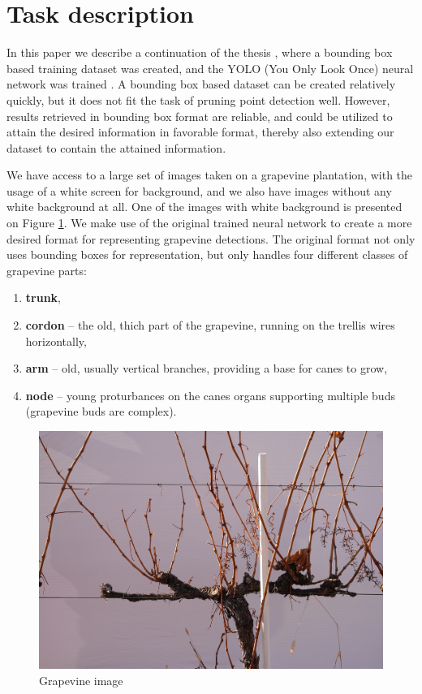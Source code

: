 \documentclass{PSAIE}%
\begin{document}
\section{Task description} \label{sec_task_description}
In this paper we describe a continuation of the thesis \cite{bolyki_2021}, where a bounding box based training
dataset was created, and the YOLO (You Only Look Once) neural network was trained
\cite{glenn_jocher_2021_5563715}.
A bounding box based dataset can be created relatively quickly, but it does not fit the task of pruning
point detection well. However, results retrieved in bounding box format are reliable, and could be utilized
to attain the desired information in favorable format, thereby also extending our dataset to contain the
attained information.

We have access to a large set of images taken on a grapevine plantation, with the usage of a white screen
for background, and we also have images without any white background at all. One of the images with
white background is presented on Figure \ref{fig_grapevine_image}.
We make use of the original \cite{bolyki_2021} trained neural network to create a more desired
format for representing grapevine detections. The original format not only uses bounding boxes for
representation, but only handles four different classes of grapevine parts:
\begin{enumerate}
      \item \textbf{trunk},
      \item \textbf{cordon} -- the old, thich part of the grapevine, running on the trellis wires horizontally,
      \item \textbf{arm} -- old, usually vertical branches, providing a base for canes to grow,
      \item \textbf{node} -- young proturbances on the canes organs supporting multiple buds
            (grapevine buds are complex).
\end{enumerate}

\begin{figure}[h]
      \centering
      \includegraphics[scale=0.08]{images/grapevine_image.jpg}
      \caption{Grapevine image}
      \label{fig_grapevine_image}
\end{figure}
\end{document}
